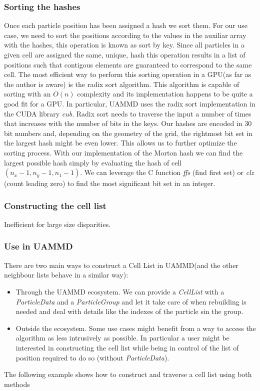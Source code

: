 \documentclass[ twoside,openright,titlepage,numbers=noenddot,%
headinclude,footinclude,cleardoublepage=empty,abstract=on,
BCOR=5mm,paper=a4,fontsize=11pt, dvipsnames
]{scrreprt}
\newcommand{\uammd}{\gls{UAMMD}\xspace}
\newcommand{\gpu}{\gls{GPU}\xspace}
\begin{document}
\subsubsection*{Sorting the hashes}
Once each particle position has been assigned a hash we sort them. For our use case, we need to sort the positions according to the values in the auxiliar array with the hashes, this operation is known as sort by key. Since all particles in a given cell are assigned the same, unique, hash this operation results in a list of positions such that contigous elements are guaranteed to correspond to the same cell.
The most efficient way to perform this sorting operation in a \gpu (as far as the author is aware) is the radix sort algorithm\cite{Ha2009}\cite{Singh2018}\cite{Merrill2011}. This algorithm is capable of sorting with an $O(n)$ complexity and its implementation happens to be quite a good fit for a \gpu. In particular, \uammd uses the radix sort implementation in the CUDA library \emph{cub}\cite{cub}. Radix sort needs to traverse the input a number of times that increases with the number of bits in the keys. Our hashes are encoded in $30$ bit numbers and, depending on the geometry of the grid, the rightmost bit set in the largest hash might be even lower. This allows us to further optimize the sorting process. With our implementation of the Morton hash we can find the largest possible hash simply by evaluating the hash of cell $(n_x-1, n_y-1, n_1-1)$. We can leverage the C function \emph{ffs} (find first set) or \emph{clz} (count leading zero) to find the most significant bit set in an integer.


\subsubsection*{Constructing the cell list}


Inefficient for large size disparities.
\subsubsection{Use in UAMMD}
There are two main ways to construct a Cell List in \uammd (and the other neighbour lists behave in a similar way):
\begin{itemize}
\item Through the \uammd ecosystem.
  We can provide a \emph{CellList} with a \emph{ParticleData} and a \emph{ParticleGroup} and let it take care of when rebuilding is needed and deal with details like the indexes of the particle sin the group.
\item Outside the ecosystem.
  Some use cases might benefit from a way to access the algorithm as less intrusively as possible. In particular a user might be interested in constructing the cell list while being in control of the list of position required to do so (without \emph{ParticleData}).
\end{itemize}
The following example shows how to construct and traverse a cell list using both methods
\end{document}
